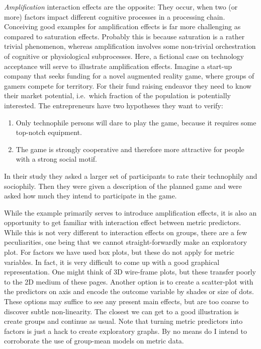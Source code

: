 \documentclass[]{svmono}
\theoremstyle{definition}
\theoremstyle{definition}
\theoremstyle{definition}
\theoremstyle{remark}
\begin{document}
\emph{Amplification} interaction effects are the opposite: They occur,
when two (or more) factors impact different cognitive processes in a
processing chain. Conceiving good examples for amplification effects is
far more challenging as compared to saturation effects. Probably this is
because saturation is a rather trivial phenomenon, whereas amplification
involves some non-trivial orchestration of cognitive or physiological
subprocesses. Here, a fictional case on technology acceptance will serve
to illustrate amplification effects. Imagine a start-up company that
seeks funding for a novel augmented reality game, where groups of gamers
compete for territory. For their fund raising endeavor they need to know
their market potential, i.e.~which fraction of the population is
potentially interested. The entrepreneurs have two hypotheses they want
to verify:

\begin{enumerate}
\def\labelenumi{\arabic{enumi}.}
\item
  Only technophile persons will dare to play the game, because it
  requires some top-notch equipment.
\item
  The game is strongly cooperative and therefore more attractive for
  people with a strong social motif.
\end{enumerate}

In their study they asked a larger set of participants to rate their
technophily and sociophily. Then they were given a description of the
planned game and were asked how much they intend to participate in the
game.

While the example primarily serves to introduce amplification effects,
it is also an opportunity to get familiar with interaction effect
between metric predictors. While this is not very different to
interaction effects on groups, there are a few peculiarities, one being
that we cannot straight-forwardly make an exploratory plot. For factors
we have used box plots, but these do not apply for metric variables. In
fact, it is very difficult to come up with a good graphical
representation. One might think of 3D wire-frame plots, but these
transfer poorly to the 2D medium of these pages. Another option is to
create a scatter-plot with the predictors on axis and encode the outcome
variable by shades or size of dots. These options may suffice to see any
present main effects, but are too coarse to discover subtle
non-linearity. The closest we can get to a good illustration is create
groups and continue as usual. Note that turning metric predictors into
factors is just a hack to create exploratory graphs. By no means do I
intend to corroborate the use of group-mean models on metric data.
\end{document}
